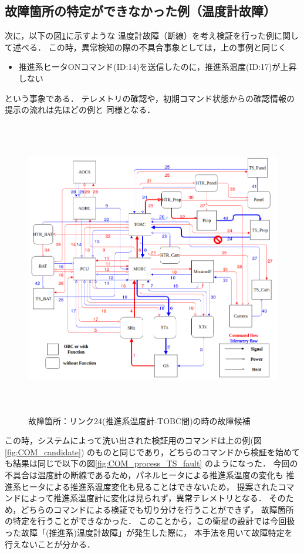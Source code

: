 \documentclass[11pt]{jsreport}
\begin{document}
\subsection{故障箇所の特定ができなかった例（温度計故障）}
次に，以下の図\ref{fig:fault_mode2}に示すような
温度計故障（断線）を考え検証を行った例に関して述べる．
この時，異常検知の際の不具合事象としては，上の事例と同じく
\begin{itemize}
   \item 推進系ヒータONコマンド(ID:14)を送信したのに，推進系温度(ID:17)が上昇しない
\end{itemize}
という事象である．
テレメトリの確認や，初期コマンド状態からの確認情報の提示の流れは先ほどの例と
同様となる．
\begin{figure}[H]
   \centering
      \includegraphics[height=13.0cm]{figure/fault_mode2.png}
      \caption{故障箇所：リンク24(推進系温度計-TOBC間)の時の故障候補}
      \label{fig:fault_mode2}
\end{figure}
この時，システムによって洗い出された検証用のコマンドは上の例(図\ref{fig:COM_candidate})
のものと同じであり，どちらのコマンドから検証を始めても結果は同じで以下の図\ref{fig:COM_process_TS_fault}
のようになった．
今回の不具合は温度計の断線であるため，パネルヒータによる推進系温度の変化も
推進系ヒータによる推進系温度変化も見ることはできないため，
提案されたコマンドによって推進系温度計に変化は見られず，異常テレメトリとなる．
そのため，どちらのコマンドによる検証でも切り分けを行うことができず，
故障箇所の特定を行うことができなかった．
このことから，この衛星の設計では今回扱った故障「(推進系)温度計故障」が発生した際に，
本手法を用いて故障特定を行えないことが分かる．\\
\end{document}
